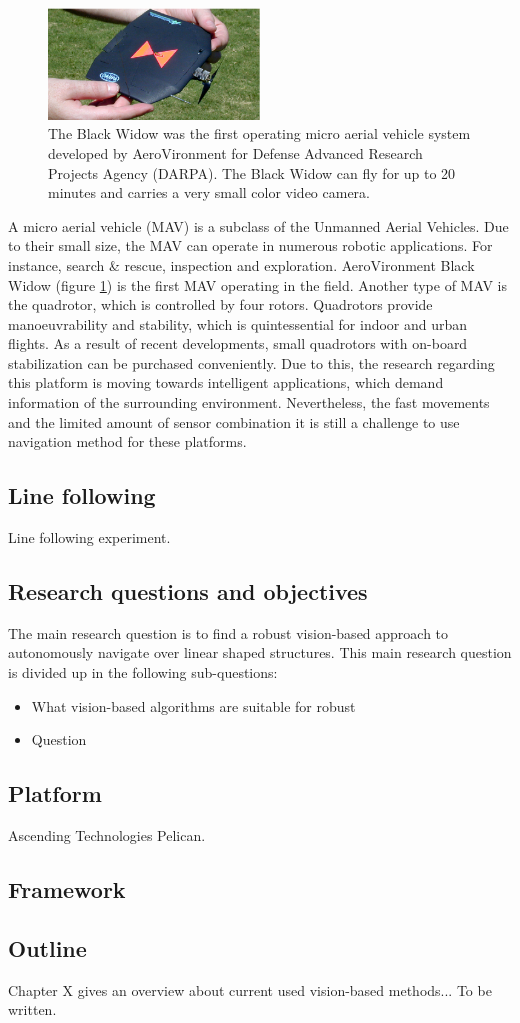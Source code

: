 \documentclass[a4paper]{article}
\begin{document}
\begin{figure}[!h]
	\centering
	\includegraphics[width=0.5\textwidth]{images/blackwidow.eps}
	\caption{The Black Widow was the first operating micro aerial vehicle system developed by AeroVironment for Defense Advanced Research Projects Agency (DARPA). The Black Widow can fly for up to 20 minutes and carries a very small color video camera.}
	\label{blackwidow}
\end{figure}

A micro aerial vehicle (MAV) is a subclass of the Unmanned Aerial Vehicles. Due to their small size, the MAV can operate in numerous robotic applications. For instance, search \&  rescue, inspection and exploration. AeroVironment Black Widow (figure \ref{blackwidow}) is the first MAV operating in the field. Another type of MAV is the quadrotor, which is controlled by four rotors. Quadrotors provide  
manoeuvrability and stability, which is quintessential for indoor and urban flights. As a result of recent developments, small quadrotors with on-board stabilization can be purchased conveniently. Due to this, the research regarding this platform is moving towards intelligent applications, which demand information of the surrounding environment. Nevertheless, the fast movements and the limited amount of sensor combination it is still a challenge to use navigation method for these platforms.

\subsection{Line following}
Line following experiment.
\subsection{Research questions and objectives}
The main research question is to find a robust vision-based approach to autonomously navigate over linear shaped structures. This main research question is divided up in the following sub-questions:
\begin{itemize}
\item What vision-based algorithms are suitable for robust  
\item Question
\end{itemize}
\subsection{Platform}
Ascending Technologies Pelican.
\subsection{Framework}
\subsection{Outline}
Chapter X gives an overview about current used vision-based methods...
To be written.
\end{document}

